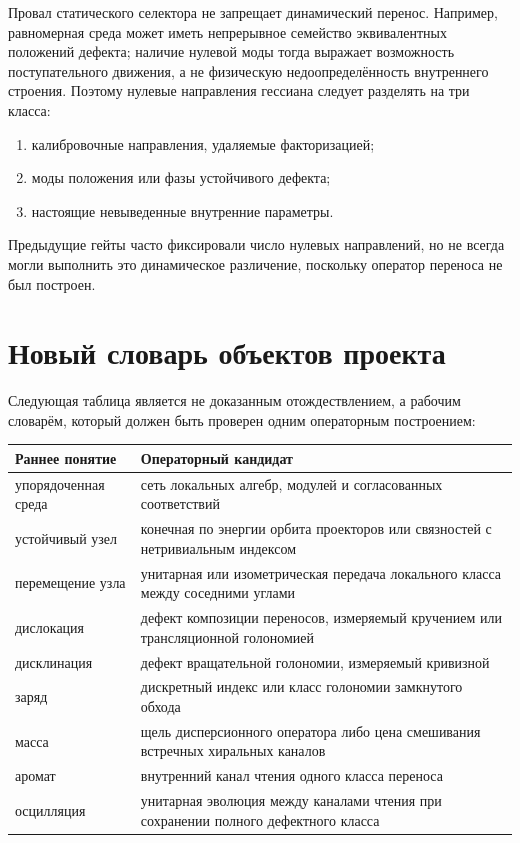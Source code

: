 Провал статического селектора не запрещает динамический перенос. Например,
равномерная среда может иметь непрерывное семейство эквивалентных положений
дефекта; наличие нулевой моды тогда выражает возможность поступательного
движения, а не физическую недоопределённость внутреннего строения. Поэтому
нулевые направления гессиана следует разделять на три класса:
\begin{enumerate}
 \item калибровочные направления, удаляемые факторизацией;
 \item моды положения или фазы устойчивого дефекта;
 \item настоящие невыведенные внутренние параметры.
\end{enumerate}
Предыдущие гейты часто фиксировали число нулевых направлений, но не всегда
могли выполнить это динамическое различение, поскольку оператор переноса
не был построен.

\section{Новый словарь объектов проекта}

Следующая таблица является не доказанным отождествлением, а рабочим
словарём, который должен быть проверен одним операторным построением:
\begin{center}
\begin{tabular}{p{}p{}}
\toprule
Раннее понятие & Операторный кандидат \\
\midrule
упорядоченная среда & сеть локальных алгебр, модулей и согласованных
соответствий \\
устойчивый узел & конечная по энергии орбита проекторов или связностей с
нетривиальным индексом \\
перемещение узла & унитарная или изометрическая передача локального класса
между соседними углами \\
дислокация & дефект композиции переносов, измеряемый кручением или
трансляционной голономией \\
дисклинация & дефект вращательной голономии, измеряемый кривизной \\
заряд & дискретный индекс или класс голономии замкнутого обхода \\
масса & щель дисперсионного оператора либо цена смешивания встречных
хиральных каналов \\
аромат & внутренний канал чтения одного класса переноса \\
осцилляция & унитарная эволюция между каналами чтения при сохранении
полного дефектного класса \\
\bottomrule
\end{tabular}
\end{center}

